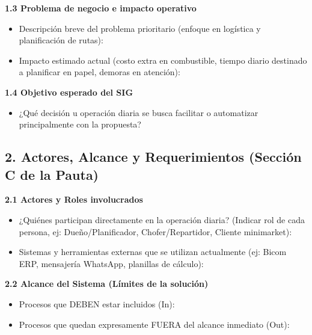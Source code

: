 \documentclass[10pt,a4paper]{article}
\begin{document}
\textbf{1.3 Problema de negocio e impacto operativo}

\begin{itemize}[leftmargin=1.2cm]
    \item Descripción breve del problema prioritario (enfoque en logística y planificación de rutas): \underline{\hspace{7cm}}
    \item Impacto estimado actual (costo extra en combustible, tiempo diario destinado a planificar en papel, demoras en atención): \underline{\hspace{7cm}}
\end{itemize}

\textbf{1.4 Objetivo esperado del SIG}

\begin{itemize}[leftmargin=1.2cm]
    \item ¿Qué decisión u operación diaria se busca facilitar o automatizar principalmente con la propuesta? \underline{\hspace{7cm}}
\end{itemize}

\subsection*{2. Actores, Alcance y Requerimientos (Sección C de la Pauta)}

\textbf{2.1 Actores y Roles involucrados}

\begin{itemize}[leftmargin=1.2cm]
    \item ¿Quiénes participan directamente en la operación diaria? (Indicar rol de cada persona, ej: Dueño/Planificador, Chofer/Repartidor, Cliente minimarket): \underline{\hspace{7cm}}
    \item Sistemas y herramientas externas que se utilizan actualmente (ej: Bicom ERP, mensajería WhatsApp, planillas de cálculo): \underline{\hspace{7cm}}
\end{itemize}

\textbf{2.2 Alcance del Sistema (Límites de la solución)}

\begin{itemize}[leftmargin=1.2cm]
    \item Procesos que DEBEN estar incluidos (In): \underline{\hspace{7cm}}
    \item Procesos que quedan expresamente FUERA del alcance inmediato (Out): \underline{\hspace{7cm}}
\end{itemize}
\end{document}
